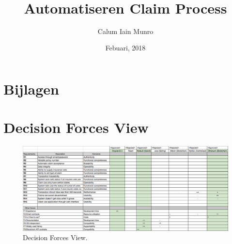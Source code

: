 \documentclass[firstyr,a4paper,oneside]{cam-thesis}%
\title{Automatiseren Claim Process}
\author{Calum Iain Munro}
\date{Febuari, 2018}
\let\cleardoublepage=\clearpage
\begin{document}
\frontmatter{}

\setlength{\parindent}{0em}
\setlength{\parskip}{1em}


%
%







{}



\chapter{Bijlagen}
\appendix
\chapter{Decision Forces View}\label{appendix:decisionForcesView}
\begin{figure}[h!]
    \begin{center}
        \includegraphics[width=\paperwidth-100]{images/decisonForcesView}
        \caption{Decision Forces View.}
    \end{center}
\end{figure}

\newpage
\end{document}
